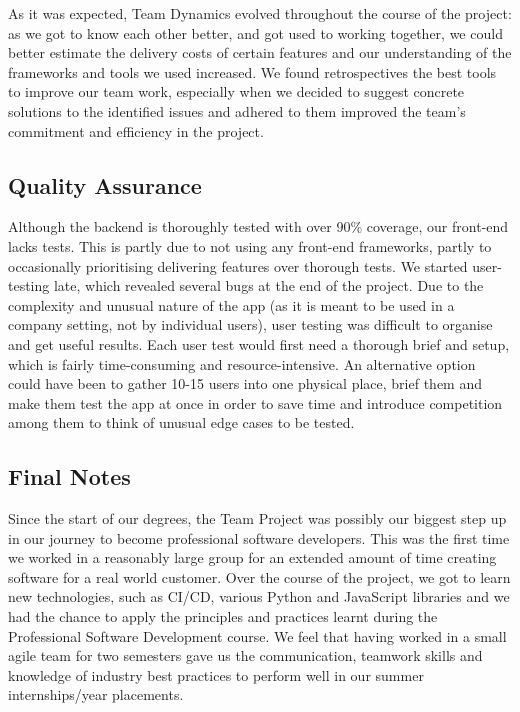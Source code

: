 \documentclass{l3proj}
\begin{document}
As it was expected, Team Dynamics evolved throughout the course of the project: as we got to know each other better, and got used to working together, we could better estimate the delivery costs of certain features and our understanding of the frameworks and tools we used increased. We found retrospectives the best tools to improve our team work, especially when we decided to suggest concrete solutions to the identified issues and adhered to them improved the team's commitment and efficiency in the project. 


\subsection{Quality Assurance}

Although the backend is thoroughly tested with over 90\% coverage, our front-end lacks tests. This is partly due to not using any front-end frameworks, partly to occasionally prioritising delivering features over thorough tests.
We started user-testing late, which revealed several bugs at the end of the project. Due to the complexity and unusual nature of the app (as it is meant to be used in a company setting, not by individual users), user testing was difficult to organise and get useful results. Each user test would first need a thorough brief and setup, which is fairly time-consuming and resource-intensive. An alternative option could have been to gather 10-15 users into one physical place, brief them and make them test the app at once in order to save time and introduce competition among them to think of unusual edge cases to be tested.


\subsection{Final Notes}

Since the start of our degrees, the Team Project was possibly our biggest step up in our journey to become professional software developers. This was the first time we worked in a reasonably large group for an extended amount of time creating software for a real world customer. Over the course of the project, we got to learn new technologies, such as CI/CD, various Python and JavaScript libraries and we had the chance to apply the principles and practices learnt during the Professional Software Development course. We feel that having worked in a small agile team for two semesters gave us the communication, teamwork skills and knowledge of industry best practices to perform well in our summer internships/year placements.



\end{document}
